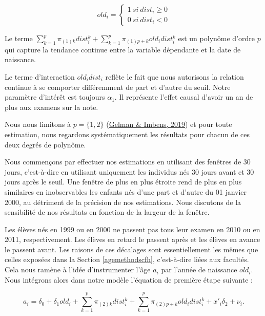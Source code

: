 \documentclass[
]{book}
\begin{document}
\[
old_i = 
\begin{cases} 
1 \ si \ dist_i \geq 0 \\
0 \ si \ dist_i < 0
\end{cases}
\]

Le terme \(\sum_{k = 1}^p \pi_{(1)k} dist_i^k + \sum_{k = 1}^p \pi_{(1)p+k} old_i dist_i^k\) est un polynôme d'ordre \(p\) qui capture la tendance continue entre la variable dépendante et la date de naissance.

Le terme d'interaction \(old_i dist_i\) reflète le fait que nous autorisons la relation continue à se comporter différemment de part et d'autre du seuil.
Notre paramètre d'intérêt est toujours \(\alpha_1\). Il représente l'effet causal d'avoir un an de plus aux examens sur la note.

\quad Nous nous limitons à \(p = \{1, 2\}\) (\protect\hyperlink{ref-GEL:IMB:19}{Gelman \& Imbens, 2019}) et pour toute estimation, nous regardons systématiquement les résultats pour chacun de ces deux degrés de polynôme.

\quad Nous commençons par effectuer nos estimations en utilisant des fenêtres de 30 jours, c'est-à-dire en utilisant uniquement les individus nés 30 jours avant et 30 jours après le seuil. Une fenêtre de plus en plus étroite rend de plus en plus similaires en inobservables les enfants nés d'une part et d'autre du 01 janvier 2000, au détriment de la précision de nos estimations. Nous discutons de la sensibilité de nos résultats en fonction de la largeur de la fenêtre.

Les élèves nés en 1999 ou en 2000 ne passent pas tous leur examen en 2010 ou en 2011, respectivement. Les élèves en retard le passent après et les élèves en avance le passent avant. Les raisons de ces décalages sont essentiellement les mêmes que celles exposées dans la Section \ref{agemethodscfh}, c'est-à-dire liées aux facultés. Cela nous ramène à l'idée d'instrumenter l'âge \(a_i\) par l'année de naissance \(old_i\). Nous intégrons alors dans notre modèle l'équation de première étape suivante :

\begin{equation}
\label{eq:ageperd}
a_i = \delta_0 + \delta_1 old_i + \sum_{k = 1}^p \pi_{(2)k} dist_i^k + \sum_{k = 1}^p \pi_{(2)p+k} old_i dist_i^k + x' _i \delta_2 + \nu_i.
\end{equation}
\end{document}
